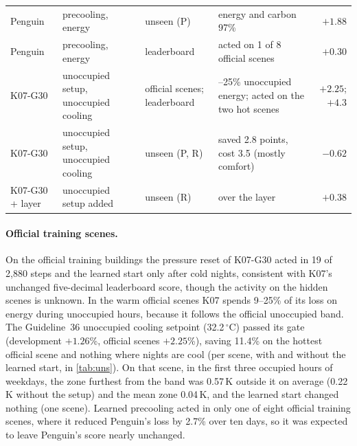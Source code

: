 \begin{table}[!htbp]
\begin{tabular}{>{\raggedright\arraybackslash}p{1.9cm}>{\raggedright\arraybackslash}p{2.7cm}>{\raggedright\arraybackslash}p{2.6cm}>{\raggedright\arraybackslash}p{3.8cm}r}
Penguin & precooling, energy & unseen (P) & energy and carbon 97\% & $+1.88$\\
Penguin & precooling, energy & leaderboard & acted on 1 of 8 official scenes & $+0.30$\\
K07-G30 & unoccupied setup, unoccupied cooling & official scenes; leaderboard & 9--25\% unoccupied energy; acted on the two hot scenes & $+2.25$; $+4.3$\\
K07-G30 & unoccupied setup, unoccupied cooling & unseen (P, R) & saved 2.8 points, cost 3.5 (mostly comfort) & $-0.62$\\
K07-G30 + layer & unoccupied setup added & unseen (R) & over the layer & $+0.38$\\
\bottomrule
\end{tabular}
\end{table}

\paragraph{Official training scenes.} On the official training buildings the pressure reset of K07-G30 acted in 19 of
2{,}880 steps and the learned start only after cold nights, consistent with K07's unchanged five-decimal leaderboard score, though the activity on the hidden scenes is
unknown. In the warm official scenes K07 spends 9--25\% of its loss on energy during unoccupied hours, because it follows the
official unoccupied band. The Guideline~36 unoccupied cooling setpoint (32.2\,$^\circ$C) passed its gate (development
$+1.26$\%, official scenes $+2.25$\%), saving 11.4\% on the hottest official scene and nothing where nights are cool (per scene, with and without the learned
start, in \cref{tab:uns}). On that scene, in the first three occupied hours of weekdays, the zone furthest from the band was
0.57\,K outside it on average (0.22\,K without the setup) and the mean zone 0.04\,K, and the learned start changed nothing
(one scene). Learned precooling
acted in only one of eight official training scenes, where it reduced Penguin's loss by 2.7\% over ten days, so it was
expected to leave Penguin's score nearly unchanged.

